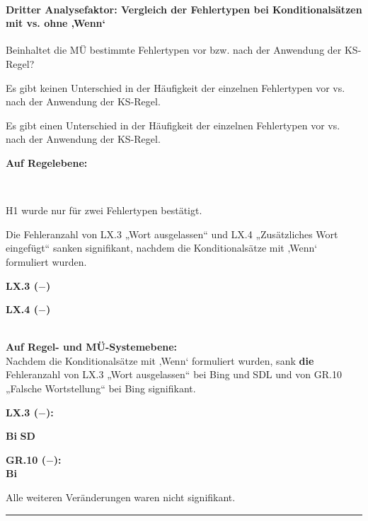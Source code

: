 \paragraph*{Dritter Analysefaktor: Vergleich der Fehlertypen bei Konditionalsätzen mit vs. ohne ‚Wenn‘}
\begin{description}[font=\normalfont\bfseries]
\item [Fragestellung:] Beinhaltet die MÜ bestimmte Fehlertypen vor bzw. nach der Anwendung der KS-Regel?
\item [H0 --] Es gibt keinen Unterschied in der Häufigkeit der einzelnen Fehlertypen vor vs. nach der Anwendung der KS-Regel.
\item [H1 --] Es gibt einen Unterschied in der Häufigkeit der einzelnen Fehlertypen vor vs. nach der Anwendung der KS-Regel.
\item [Resultat]
\end{description}
\noindent
\parbox[t]{.8\textwidth}{\textbf{Auf Regelebene:}}\\
\noindent
\parbox[t]{.8\textwidth}{
H1 wurde nur für zwei Fehlertypen bestätigt.

Die Fehleranzahl von LX.3 „Wort ausgelassen“ und LX.4 „Zusätzliches Wort eingefügt“ sanken signifikant, nachdem die Konditionalsätze mit ‚Wenn‘ formuliert wurden.
}
\parbox[t]{.04\textwidth}{}
\colorbox{smGreen}{\parbox[t]{.15\textwidth}{
\textbf{LX.3 ($-$)}

\textbf{LX.4 ($-$)}\\
\\
}}

\noindent
\parbox[t]{.8\textwidth}{\textbf{Auf Regel- und MÜ-Systemebene:}\\
Nachdem die Konditionalsätze mit ‚Wenn‘ formuliert wurden, sank \textbf{die} Fehleranzahl von LX.3 „Wort ausgelassen“ bei Bing und SDL und von GR.10 „Falsche Wortstellung“ bei Bing signifikant.
}
\parbox[t]{.04\textwidth}{}
\colorbox{smGreen}{\parbox[t]{.15\textwidth}{
{ \textbf{LX.3 ($-$):}}

{ \textbf{Bi}}{ \textbf{SD}}

{ \textbf{GR.10 ($-$):\\Bi}}
}}

\medskip
\noindent
\parbox[t]{.8\textwidth}{
Alle weiteren Veränderungen waren nicht signifikant.
}

\hrule
